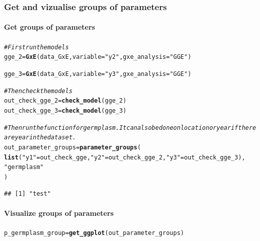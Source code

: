 \documentclass{book}\usepackage[]{graphicx}\usepackage[]{color}
\makeatletter
\newcommand{\hlstr}[1]{\textcolor[rgb]{0.192,0.494,0.8}{#1}}%
\newcommand{\hlcom}[1]{\textcolor[rgb]{0.678,0.584,0.686}{\textit{#1}}}%
\newcommand{\hlstd}[1]{\textcolor[rgb]{0.345,0.345,0.345}{#1}}%
\newcommand{\hlkwb}[1]{\textcolor[rgb]{0.69,0.353,0.396}{#1}}%
\newcommand{\hlkwc}[1]{\textcolor[rgb]{0.333,0.667,0.333}{#1}}%
\newcommand{\hlkwd}[1]{\textcolor[rgb]{0.737,0.353,0.396}{\textbf{#1}}}%
\newenvironment{kframe}{%
 \def\at@end@of@kframe{}%
 \ifinner\ifhmode%
  \def\at@end@of@kframe{\end{minipage}}%
  \begin{minipage}{\columnwidth}%
 \fi\fi%
 \def\FrameCommand##1{\hskip\@totalleftmargin \hskip-\fboxsep
 \colorbox{shadecolor}{##1}\hskip-\fboxsep
     \hskip-\linewidth \hskip-\@totalleftmargin \hskip\columnwidth}%
 \MakeFramed {\advance\hsize-\width
   \@totalleftmargin\z@ \linewidth\hsize
   \@setminipage}}%
 {\par\unskip\endMakeFramed%
 \at@end@of@kframe}
\newenvironment{knitrout}{}{} %
\makeatother
\begin{document}
\subsubsection{Get and vizualise groups of parameters}

\paragraph{Get groups of parameters}

\begin{knitrout}
\color{fgcolor}\begin{kframe}
\begin{alltt}
\hlcom{# First run the models}
\hlstd{gge_2} \hlkwb{=} \hlkwd{GxE}\hlstd{(data_GxE,} \hlkwc{variable} \hlstd{=} \hlstr{"y2"}\hlstd{,} \hlkwc{gxe_analysis} \hlstd{=} \hlstr{"GGE"}\hlstd{)}
\end{alltt}


{\ttfamily\noindent\itshape\color{messagecolor}{\#\# GGE model done for y2}}\begin{alltt}
\hlstd{gge_3} \hlkwb{=} \hlkwd{GxE}\hlstd{(data_GxE,} \hlkwc{variable} \hlstd{=} \hlstr{"y3"}\hlstd{,} \hlkwc{gxe_analysis} \hlstd{=} \hlstr{"GGE"}\hlstd{)}
\end{alltt}


{\ttfamily\noindent\itshape\color{messagecolor}{\#\# GGE model done for y3}}\begin{alltt}
\hlcom{# Then check the models}
\hlstd{out_check_gge_2} \hlkwb{=} \hlkwd{check_model}\hlstd{(gge_2)}
\hlstd{out_check_gge_3} \hlkwb{=} \hlkwd{check_model}\hlstd{(gge_3)}

\hlcom{# Then run the function for germplasm. It can also be done on location or year if there are year in the data set.}
\hlstd{out_parameter_groups} \hlkwb{=} \hlkwd{parameter_groups}\hlstd{(}
  \hlkwd{list}\hlstd{(}\hlstr{"y1"} \hlstd{= out_check_gge,} \hlstr{"y2"} \hlstd{= out_check_gge_2,} \hlstr{"y3"} \hlstd{= out_check_gge_3),}
  \hlstr{"germplasm"}
  \hlstd{)}
\end{alltt}
\begin{verbatim}
## [1] "test"
\end{verbatim}
\end{kframe}
\end{knitrout}

\paragraph{Visualize groups of parameters}
\begin{knitrout}
\color{fgcolor}\begin{kframe}
\begin{alltt}
\hlstd{p_germplasm_group} \hlkwb{=} \hlkwd{get_ggplot}\hlstd{(out_parameter_groups)}
\end{alltt}
\end{kframe}
\end{knitrout}
\end{document}
